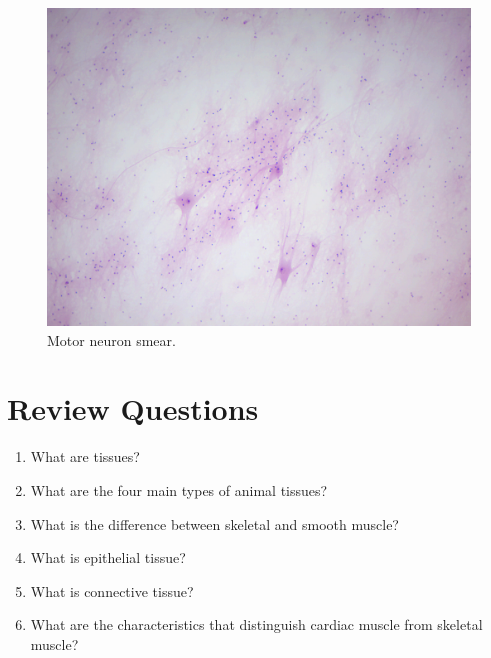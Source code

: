 \begin{figure}

{\centering \includegraphics[width=0.7\linewidth]{./figures/tissues/neuron_smear}

}

\caption{Motor neuron smear.}\label{fig:neuron}
\end{figure}

\section{Review Questions}\label{review-questions-7}

\begin{enumerate}
\def\labelenumi{\arabic{enumi}.}
\tightlist
\item
  What are tissues?
\item
  What are the four main types of animal tissues?
\item
  What is the difference between skeletal and smooth muscle?
\item
  What is epithelial tissue?
\item
  What is connective tissue?
\item
  What are the characteristics that distinguish cardiac muscle from
  skeletal muscle?  
\end{enumerate}

